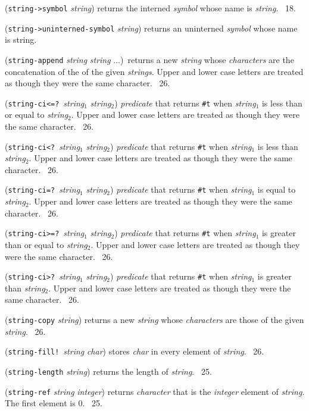 \documentclass[10pt,twocolumn]{article}
\begin{document}
(\texttt{string->symbol} \emph{string}) returns the interned
\emph{symbol} whose name is \emph{string}.  \RRRRRS~18.

(\texttt{string->uninterned-symbol} \emph{string}) returns an
uninterned \emph{symbol} whose name is string.

(\texttt{string-append} \emph{string} \emph{string} ...)\ returns a
new \emph{string} whose \emph{characters} are the concatenation of the
of the given \emph{strings}. Upper and lower case letters are treated
as though they were the same character. \RRRRRS~26.

(\texttt{string-ci<=?}\ \emph{string}$_1$ \emph{string}$_2$)
\emph{predicate} that returns \texttt{\#t} when \emph{string}$_1$ is
less than or equal to \emph{string}$_2$.  Upper and lower case letters
are treated as though they were the same character. \RRRRRS~26.

(\texttt{string-ci<?}\ \emph{string}$_1$ \emph{string}$_2$)
\emph{predicate} that returns \texttt{\#t} when \emph{string}$_1$ is
less than \emph{string}$_2$.  Upper and lower case letters are treated
as though they were the same character. \RRRRRS~26.

(\texttt{string-ci=?}\ \emph{string}$_1$ \emph{string}$_2$)
\emph{predicate} that returns \texttt{\#t} when \emph{string}$_1$ is
equal to \emph{string}$_2$.  Upper and lower case letters are treated
as though they were the same character. \RRRRRS~26.

(\texttt{string-ci>=?}\ \emph{string}$_1$ \emph{string}$_2$)
\emph{predicate} that returns \texttt{\#t} when \emph{string}$_1$ is
greater than or equal to \emph{string}$_2$.  Upper and lower case
letters are treated as though they were the same
character. \RRRRRS~26.

(\texttt{string-ci>?}\ \emph{string}$_1$ \emph{string}$_2$)
\emph{predicate} that returns \texttt{\#t} when \emph{string}$_1$ is
greater than \emph{string}$_2$.  Upper and lower case letters are
treated as though they were the same character. \RRRRRS~26.

(\texttt{string-copy} \emph{string}) returns a new \emph{string} whose
\emph{characters} are those of the given \emph{string}.  \RRRRRS~26.

(\texttt{string-fill!}\ \emph{string} \emph{char}) stores \emph{char}
in every element of \emph{string}.  \RRRRRS~26.

(\texttt{string-length} \emph{string}) returns the length of
\emph{string}.  \RRRRRS~25.

(\texttt{string-ref} \emph{string} \emph{integer}) returns
\emph{character} that is the \emph{integer} element of \emph{string}.
The first element is 0. \RRRRRS~25.
\end{document}

